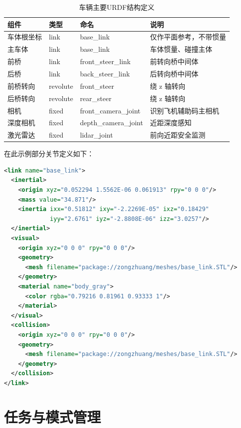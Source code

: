 \begin{table}[H]
\centering
\caption{车辆主要URDF结构定义}
\label{tab:urdf_structure}
\footnotesize
\renewcommand{\arraystretch}{1.18}
\begin{tabularx}{\textwidth}{p{}p{}p{}X}
\toprule
组件 & 类型 & 命名 & 说明 \\
\midrule
车体根坐标 & link & base\_link & 仅作平面参考，不带惯量 \\
主车体 & link & base\_link & 车体惯量、碰撞主体 \\
前桥 & link & front\_steer\_link & 前转向桥中间体 \\
后桥 & link & back\_steer\_link & 后转向桥中间体 \\
前桥转向 & revolute & front\_steer & 绕 z 轴转向 \\
后桥转向 & revolute & rear\_steer & 绕 z 轴转向 \\
相机 & fixed & front\_camera\_joint & 识别飞机辅助码主相机 \\
深度相机 & fixed & depth\_camera\_joint & 近距深度感知 \\
激光雷达 & fixed & lidar\_joint & 前向近距安全监测 \\
\bottomrule
\end{tabularx}
\end{table}



在此示例部分关节定义如下：

\begin{lstlisting}[language=XML]
<link name="base_link">
  <inertial>
    <origin xyz="0.052294 1.5562E-06 0.061913" rpy="0 0 0"/>
    <mass value="34.871"/>
    <inertia ixx="0.51812" ixy="-2.2269E-05" ixz="0.18429"
             iyy="2.6761" iyz="-2.8808E-06" izz="3.0257"/>
  </inertial>
  <visual>
    <origin xyz="0 0 0" rpy="0 0 0"/>
    <geometry>
      <mesh filename="package://zongzhuang/meshes/base_link.STL"/>
    </geometry>
    <material name="body_gray">
      <color rgba="0.79216 0.81961 0.93333 1"/>
    </material>
  </visual>
  <collision>
    <origin xyz="0 0 0" rpy="0 0 0"/>
    <geometry>
      <mesh filename="package://zongzhuang/meshes/base_link.STL"/>
    </geometry>
  </collision>
</link>
\end{lstlisting}

\section{任务与模式管理}


